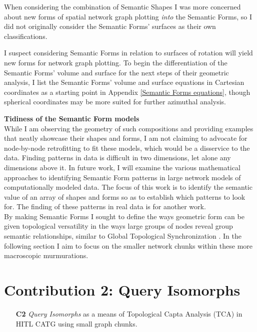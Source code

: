 When considering the combination of Semantic Shapes I was more concerned about new forms of spatial network graph plotting \textit{into} the Semantic Forms, so I did not originally consider the Semantic Forms' surfaces as their own classifications.

I suspect considering Semantic Forms in relation to surfaces of rotation will yield new forms for network graph plotting. To begin the differentiation of the Semantic Forms’ volume and surface for the next steps of their geometric analysis, I list the Semantic Forms’ volume and surface equations in Cartesian coordinates as a starting point in Appendix \autoref{Semantic Forms equations}, though spherical coordinates may be more suited for further azimuthal analysis.


\noindent \textbf{Tidiness of the Semantic Form models}
\\
While I am observing the geometry of such compositions and providing examples that neatly showcase their shapes and forms, I am not claiming to advocate for node-by-node retrofitting to fit these models, which would be a disservice to the data. Finding patterns in data is difficult in two dimensions, let alone any dimensions above it. In future work, I will examine the various mathematical approaches to identifying Semantic Form patterns in large network models of computationally modeled data. The focus of this work is to identify the semantic value of an array of shapes and forms so as to establish which patterns to look for. The finding of these patterns in real data is for another work. \\

By making Semantic Forms I sought to define the ways geometric form can be given topological versatility in the ways large groups of nodes reveal group semantic relationships, similar to Global Topological Synchronization \citep{wang_global_2024,bianconi_topology_2024}. In the following section I aim to focus on the smaller network chunks within these more macroscopic murmurations. 
  





\section{Contribution 2: Query Isomorphs}
\begin{enumerate}
        \item[\textbf{C2}] \textit{Query Isomorphs} as a means of Topological Capta Analysis (TCA) in HITL CATG using small graph chunks.
\end{enumerate}


